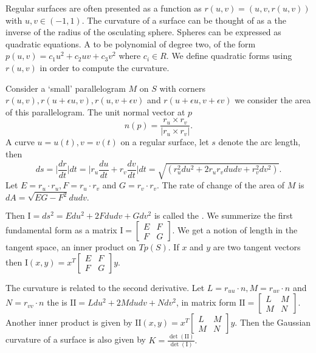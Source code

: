 Regular surfaces are often presented as a function as $r(u,v)=(u,v,r(u,v))$
with $u,v\in(-1,1)$.
The curvature of a surface can be thought of as a the inverse of
the radius of the osculating sphere. Spheres can be expressed
as quadratic equations.  A
  to be polynomial of degree two, of the form $p(u,v)=c_1u^2+c_2uv+c_3v^2$ 
where $c_i\in R$.
We define quadratic forms using $r(u,v)$ in order to compute the curvature.


Consider a `small' parallelogram $M$ on $S$ with corners $r(u,v),r(u+\epsilon u, v), r(u,v+\epsilon v)$ 
and $r(u+\epsilon u, v+\epsilon v)$ we consider the area of this parallelogram.
The unit normal vector at $p$ $$n(p)=\frac{r_u\times r_v}{|r_u\times r_v|}.$$
A curve $u=u(t), v=v(t)$ on a regular surface, let
$s$ denote the arc length, then 
$$ds=\bigg | \frac{dr}{dt}\bigg | dt = \bigg | r_u\frac{du}{dt}+r_v\frac{dv}{dt}\bigg |dt
=\sqrt{(r_u^2 du^2+2r_ur_v du dv + r_v^2dv^2)}.$$
Let $E=r_u\cdot r_u, F=r_u\cdot r_v$ and  $G=r_v\cdot r_v$.
The rate of change of the area of $M$ is 
$dA=\sqrt{EG-F^2}dudv.$

Then $\mathrm{I}=ds^2=Edu^2+2Fdudv +Gdv^2$ is called the .
We summerize the first fundamental form as a matrix $\mathrm{I}=\begin{bmatrix}
E & F \\
F & G 
\end{bmatrix}.$
We get a notion of length in the tangent space, an inner product on $Tp(S)$.
If $x$ and $y$ are two tangent vectors
then $\mathrm{I}(x,y)=x^T\begin{bmatrix}
E & F \\
F & G 
\end{bmatrix}y.$



The curvature is related to the second derivative.
Let $L=r_{uu}\cdot n, M=r_{uv}\cdot n$ and $N=r_{vv}\cdot n$ the
 is $\mathrm{I\!I}=Ldu^2+2Mdudv+Ndv^2$,
in matrix form $\mathrm{I\!I}=\begin{bmatrix}
L & M \\
M & N 
\end{bmatrix}.$
Another inner product is given by $\mathrm{I\!I}(x,y)=x^T\begin{bmatrix}
L & M \\
M & N 
\end{bmatrix}y.$
Then the Gaussian curvature of a surface is also given by
$K=\frac{\det(\mathrm{I\!I})}{\det(\mathrm{I})}.$


